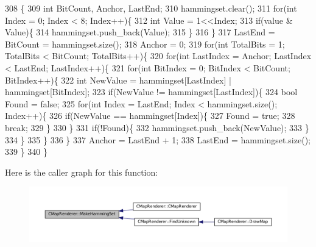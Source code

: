 \begin{DoxyCode}
308                                                                         \{
309     \textcolor{keywordtype}{int} BitCount, Anchor, LastEnd;
310     hammingset.clear();
311     \textcolor{keywordflow}{for}(\textcolor{keywordtype}{int} Index = 0; Index < 8; Index++)\{
312         \textcolor{keywordtype}{int} Value = 1<<Index;
313         \textcolor{keywordflow}{if}(value & Value)\{
314             hammingset.push\_back(Value);
315         \}
316     \}
317     LastEnd = BitCount = hammingset.size();
318     Anchor = 0;
319     \textcolor{keywordflow}{for}(\textcolor{keywordtype}{int} TotalBits = 1; TotalBits < BitCount; TotalBits++)\{
320         \textcolor{keywordflow}{for}(\textcolor{keywordtype}{int} LastIndex = Anchor; LastIndex < LastEnd; LastIndex++)\{
321             \textcolor{keywordflow}{for}(\textcolor{keywordtype}{int} BitIndex = 0; BitIndex < BitCount; BitIndex++)\{
322                 \textcolor{keywordtype}{int} NewValue = hammingset[LastIndex] | hammingset[BitIndex];
323                 \textcolor{keywordflow}{if}(NewValue != hammingset[LastIndex])\{
324                     \textcolor{keywordtype}{bool} Found = \textcolor{keyword}{false};
325                     \textcolor{keywordflow}{for}(\textcolor{keywordtype}{int} Index = LastEnd; Index < hammingset.size(); Index++)\{
326                         \textcolor{keywordflow}{if}(NewValue == hammingset[Index])\{
327                             Found = \textcolor{keyword}{true};
328                             \textcolor{keywordflow}{break};
329                         \}
330                     \}
331                     \textcolor{keywordflow}{if}(!Found)\{
332                         hammingset.push\_back(NewValue);   
333                     \}
334                 \}
335             \}
336         \}
337         Anchor = LastEnd + 1;
338         LastEnd = hammingset.size();
339     \}
340 \}
\end{DoxyCode}
Here is the caller graph for this function\+:
\nopagebreak
\begin{figure}[H]
\begin{center}
\leavevmode
\includegraphics[width=350pt]{classCMapRenderer_a0b06ba89b9a7ad75fa945a3c22dc019a_icgraph}
\end{center}
\end{figure}
\hypertarget{classCMapRenderer_a68b0c78e7d7d532c14eaf483f4ea3f24}{}\label{classCMapRenderer_a68b0c78e7d7d532c14eaf483f4ea3f24} 
